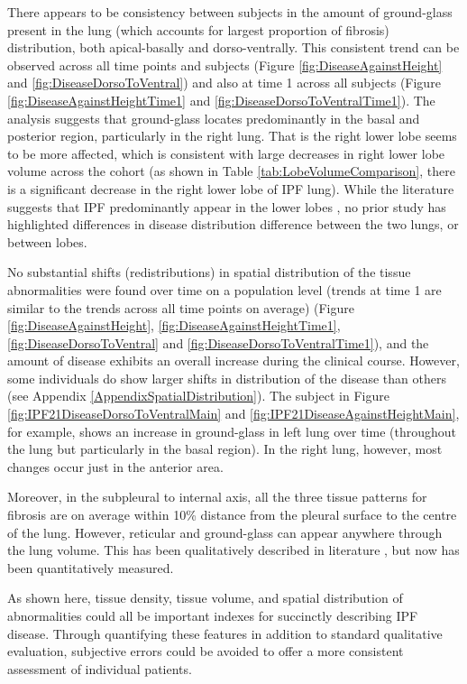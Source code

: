 There appears to be consistency between subjects in the amount of ground-glass present in the lung (which accounts for largest proportion of fibrosis) distribution, both apical-basally and dorso-ventrally. This consistent trend can be observed across all time points and subjects (Figure \ref{fig:DiseaseAgainstHeight} and \ref{fig:DiseaseDorsoToVentral}) and also at time 1 across all subjects (Figure \ref{fig:DiseaseAgainstHeightTime1} and \ref{fig:DiseaseDorsoToVentralTime1}). The analysis suggests that ground-glass locates predominantly in the basal and posterior region, particularly in the right lung. That is the right lower lobe seems to be more affected, which is consistent with large decreases in right lower lobe volume across the cohort (as shown in Table \ref{tab:LobeVolumeComparison}, there is a significant decrease in the right lower lobe of IPF lung). While the literature suggests that IPF predominantly appear in the lower lobes \citep{king2011idiopathic,raghu2011official,richeldi2017idiopathic}, no prior study has highlighted differences in disease distribution difference between the two lungs, or between lobes.

No substantial shifts (redistributions) in spatial distribution of the tissue abnormalities were found over time on a population level (trends at time 1 are similar to the trends across all time points on average) (Figure \ref{fig:DiseaseAgainstHeight}, \ref{fig:DiseaseAgainstHeightTime1}, \ref{fig:DiseaseDorsoToVentral} and \ref{fig:DiseaseDorsoToVentralTime1}), and the amount of disease exhibits an overall increase during the clinical course. However, some individuals do show larger shifts in distribution of the disease than others (see Appendix \ref{AppendixSpatialDistribution}). The subject in Figure \ref{fig:IPF21DiseaseDorsoToVentralMain} and \ref{fig:IPF21DiseaseAgainstHeightMain}, for example, shows an increase in ground-glass in left lung over time (throughout the lung but particularly in the basal region). In the right lung, however, most changes occur just in the anterior area.

Moreover, in the subpleural to internal axis, all the three tissue patterns for fibrosis are on average within 10\% distance from the pleural surface to the centre of the lung. However, reticular and ground-glass can appear anywhere through the lung volume. This has been qualitatively described in literature \citep{king2011idiopathic}, but now has been quantitatively measured. 

As shown here, tissue density, tissue volume, and spatial distribution of abnormalities could all be important indexes for succinctly describing IPF disease. Through quantifying these features in addition to standard qualitative evaluation, subjective errors could be avoided to offer a more consistent assessment of individual patients.

